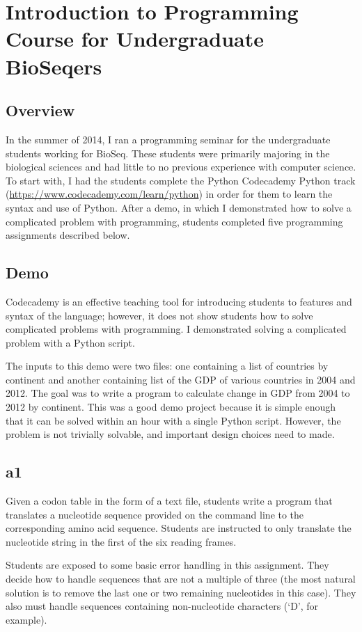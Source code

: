\documentclass{report}
\begin{document}
\section{Introduction to Programming Course for Undergraduate BioSeqers}
\subsection{Overview}
In the summer of 2014, I ran a programming seminar for the undergraduate students working for BioSeq. These students were primarily majoring in the biological sciences and had little to no previous experience with computer science. To start with, I had the students complete the Python Codecademy Python track (\url{https://www.codecademy.com/learn/python}) in order for them to learn the syntax and use of Python. After a demo, in which I demonstrated how to solve a complicated problem with programming, students completed five programming assignments described below.

\subsection{Demo}
Codecademy is an effective teaching tool for introducing students to features and syntax of the language; however, it does not show students how to solve complicated problems with programming. I demonstrated solving a complicated problem with a Python script.

The inputs to this demo were two files: one containing a list of countries by continent and another containing list of the GDP of various countries in 2004 and 2012. The goal was to write a program to calculate change in GDP from 2004 to 2012 by continent. This was a good demo project because it is simple enough that it can be solved within an hour with a single Python script. However, the problem is not trivially solvable, and important design choices need to made.

\subsection{a1}
Given a codon table in the form of a text file, students write a program that translates a nucleotide sequence provided on the command line to the corresponding amino acid sequence. Students are instructed to only translate the nucleotide string in the first of the six reading frames.

Students are exposed to some basic error handling in this assignment. They decide how to handle sequences that are not a multiple of three (the most natural solution is to remove the last one or two remaining nucleotides in this case). They also must handle sequences containing non-nucleotide characters (`D', for example).
\end{document}
